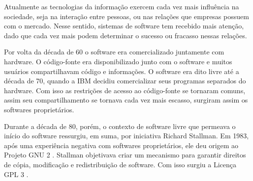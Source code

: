 %
%
%

Atualmente as tecnologias da informação exercem cada vez mais influência na sociedade, seja na interação entre pessoas, ou nas relações que empresas possuem com o mercado. Nesse sentido, sistemas de software tem recebido mais atenção, dado que cada vez mais podem determinar o sucesso ou fracasso nessas relações.

Por volta da década de 60 o software era comercializado juntamente com hardware. O código-fonte era disponibilizado junto com o software e muitos usuários compartilhavam código e informações. O software era dito livre até a década de 70, quando a IBM decidiu comercializar seus programas separados do hardware. Com isso as restrições de acesso ao código-fonte se tornaram comuns, assim seu compartilhamento se tornava cada vez mais escasso, surgiram assim os softwares proprietários.

Durante a década de 80, porém, o contexto de software livre que permeava o início do software ressurgiu, em suma, por iniciativa Richard Stallman. Em 1983, após uma experiência negativa com softwares proprietários, ele deu origem ao Projeto GNU 2 . Stallman objetivava criar um mecanismo para garantir direitos de cópia, modificação e redistribuição de software. Com isso surgiu a Licença GPL 3 .

